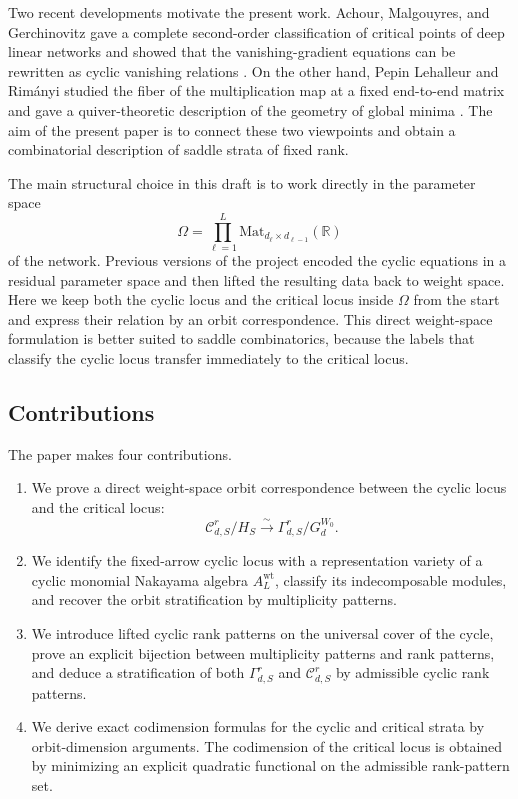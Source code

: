 \documentclass[11pt]{article}
\newcommand{\Mat}{\mathrm{Mat}}
\newcommand{\R}{\mathbb{R}}
\theoremstyle{definition}
\begin{document}
Two recent developments motivate the present work. Achour, Malgouyres, and
Gerchinovitz gave a complete second-order classification of critical points of
deep linear networks and showed that the vanishing-gradient equations can be
rewritten as cyclic vanishing relations \cite{achour2024loss}. On the other
hand, Pepin Lehalleur and Rim\'anyi studied the fiber of the multiplication map
at a fixed end-to-end matrix and gave a quiver-theoretic description of the
geometry of global minima \cite{lehalleur2024geometry}. The aim of the present
paper is to connect these two viewpoints and obtain a combinatorial description
of saddle strata of fixed rank.

The main structural choice in this draft is to work directly in the parameter
space
\[
\Omega=\prod_{\ell=1}^L \Mat_{d_\ell\times d_{\ell-1}}(\R)
\]
of the network. Previous versions of the project encoded the cyclic equations in
a residual parameter space and then lifted the resulting data back to weight
space. Here we keep both the cyclic locus and the critical locus inside
\(\Omega\) from the start and express their relation by an orbit correspondence.
This direct weight-space formulation is better suited to saddle combinatorics,
because the labels that classify the cyclic locus transfer immediately to the
critical locus.

\subsection*{Contributions}

The paper makes four contributions.

\begin{enumerate}
\item We prove a direct weight-space orbit correspondence between the cyclic
  locus and the critical locus:
  \[
  \mathcal C_{d,S}^r/H_S \xrightarrow{\sim} \Gamma_{d,S}^r/G_d^{W_0}.
  \]

\item We identify the fixed-arrow cyclic locus with a representation variety of a
  cyclic monomial Nakayama algebra \(A_L^{\mathrm{wt}}\), classify its
  indecomposable modules, and recover the orbit stratification by multiplicity
  patterns.

\item We introduce lifted cyclic rank patterns on the universal cover of the
  cycle, prove an explicit bijection between multiplicity patterns and rank
  patterns, and deduce a stratification of both \(\Gamma_{d,S}^r\) and
  \(\mathcal C_{d,S}^r\) by admissible cyclic rank patterns.

\item We derive exact codimension formulas for the cyclic and critical strata by
  orbit-dimension arguments. The codimension of the critical locus is obtained
  by minimizing an explicit quadratic functional on the admissible rank-pattern
  set.
\end{enumerate}
\end{document}
